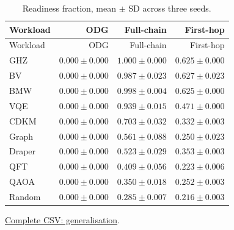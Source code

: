 \begin{center}\small
\begin{longtable}{lrrr}
\caption{Readiness fraction, mean $\pm$ SD across three seeds.}\\
\toprule
Workload & ODG & Full-chain & First-hop \\
\midrule\endfirsthead
\toprule
Workload & ODG & Full-chain & First-hop \\
\midrule\endhead
GHZ & $0.000 \pm 0.000$ & $1.000 \pm 0.000$ & $0.625 \pm 0.000$ \\
BV & $0.000 \pm 0.000$ & $0.987 \pm 0.023$ & $0.627 \pm 0.023$ \\
BMW & $0.000 \pm 0.000$ & $0.998 \pm 0.004$ & $0.625 \pm 0.000$ \\
VQE & $0.000 \pm 0.000$ & $0.939 \pm 0.015$ & $0.471 \pm 0.000$ \\
CDKM & $0.000 \pm 0.000$ & $0.703 \pm 0.032$ & $0.332 \pm 0.003$ \\
Graph & $0.000 \pm 0.000$ & $0.561 \pm 0.088$ & $0.250 \pm 0.023$ \\
Draper & $0.000 \pm 0.000$ & $0.523 \pm 0.029$ & $0.353 \pm 0.003$ \\
QFT & $0.000 \pm 0.000$ & $0.409 \pm 0.056$ & $0.223 \pm 0.006$ \\
QAOA & $0.000 \pm 0.000$ & $0.350 \pm 0.018$ & $0.252 \pm 0.003$ \\
Random & $0.000 \pm 0.000$ & $0.285 \pm 0.007$ & $0.216 \pm 0.003$ \\
\bottomrule\end{longtable}\end{center}
{\footnotesize \href{https://github.com/sanjeevkrishnaa/Compiler-Driven-ACE/blob/codex/ace-scheduler-correctness/docs/latex/oct25_pre_golden/data/generalisation.csv}{Complete CSV: generalisation}. }

